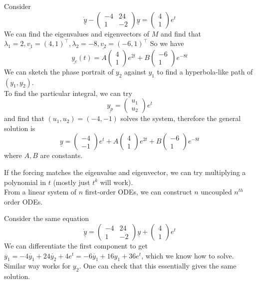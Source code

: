 \begin{example}
    Consider
    $$\underline{\dot{y}}-\begin{pmatrix}
        -4&24\\
        1&-2
    \end{pmatrix}\underline{y}=\begin{pmatrix}
        4\\
        1
    \end{pmatrix}e^t$$
    We can find the eigenvalues and eigenvectors of $M$ and find that $\lambda_1=2,\underline{v_1}=(4,1)^\top,\lambda_2=-8,\underline{v_2}=(-6,1)^\top$
    So we have
    $$\underline{y_c}(t)=A\begin{pmatrix}
        4\\
        1
    \end{pmatrix}e^{2t}+B\begin{pmatrix}
        -6\\
        1
    \end{pmatrix}e^{-8t}$$
    We can sketch the phase portrait of $y_2$ against $y_1$ to find a hyperbola-like path of $(y_1,y_2)$.\\
    To find the particular integral, we can try
    $$\underline{y_p}=\begin{pmatrix}
        u_1\\
        u_2
    \end{pmatrix}e^t$$
    and find that $(u_1,u_2)=(-4,-1)$ solves the system, therefore the general solution is
    $$
    \underline{y}=
    \begin{pmatrix}
        -4\\
        -1
    \end{pmatrix}e^t+
    A\begin{pmatrix}
        4\\
        1
    \end{pmatrix}e^{2t}+B\begin{pmatrix}
        -6\\
        1
    \end{pmatrix}e^{-8t}
    $$
    where $A,B$ are constants.
\end{example}
If the forcing matches the eigenvalue and eigenvector, we can try multiplying a polynomial in $t$ (mostly just $t^k$ will work).\\
From a linear system of $n$ first-order ODEs, we can construct $n$ uncoupled $n^{th}$ order ODEs.
\begin{example}
    Consider the same equation
    $$\underline{\dot{y}}=\begin{pmatrix}
        -4&24\\
        1&-2
    \end{pmatrix}\underline{y}+\begin{pmatrix}
        4\\
        1
    \end{pmatrix}e^t$$
    We can differentiate the first component to get $\ddot{y_1}=-4\dot{y_1}+24\dot{y_2}+4e^t=-6\dot{y_1}+16y_1+36e^t$, which we know how to solve.
    Similar way works for $y_2$.
    One can check that this essentially gives the same solution.
\end{example}
